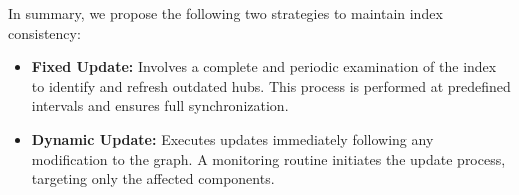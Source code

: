In summary, we propose the following two strategies to maintain index consistency:

\begin{itemize} 
    \item \textbf{Fixed Update:} Involves a complete and periodic examination of the index to identify and refresh outdated hubs. This process is performed at predefined intervals and ensures full synchronization.
    \item \textbf{Dynamic Update:} Executes updates immediately following any modification to the graph. A monitoring routine initiates the update process, targeting only the affected components.
\end{itemize}
